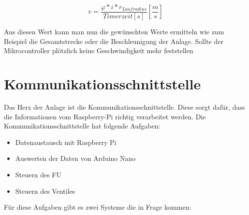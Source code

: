 \begin{center}
\begin{equation}
  \label{eq:9}
	v = \frac{\varphi * i * r_{Laufradius}}{Timerzeit [s]} [\frac{m}{s}]
\end{equation} 
\end{center}

Aus diesen Wert kann man nun die gewünschten Werte ermitteln wie zum Beispiel die Gesamtstrecke oder die Beschleunigung der Anlage. Sollte der Mikrocontroller plötzlich keine Geschwindigkeit mehr feststellen 

\newpage
\section{Kommunikationsschnittstelle}
\label{sec:kommunikationsschnittstelle}

Das Herz der Anlage ist die Kommunikationsschnittstelle. Diese sorgt dafür, dass die Informationen vom Raspberry-Pi richtig verarbeitet werden. Die Kommunikationsschnittstelle hat folgende Aufgaben:

\begin{itemize}
	\item{Datenaustausch mit Raspberry Pi}
	\item{Auswerten der Daten von Arduino Nano}
	\item{Steuern des \ac{FU}}
	\item{Steuern des Ventiles}
\end{itemize}

Für diese Aufgaben gibt es zwei Systeme die in Frage kommen: 

